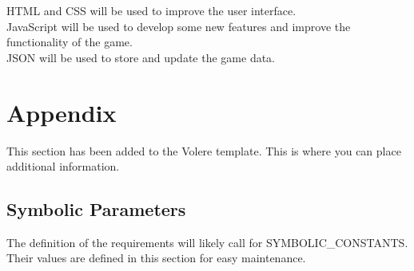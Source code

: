 \documentclass[12pt, titlepage]{article}
\begin{document}
HTML and CSS will be used to improve the user interface. \\
JavaScript will be used to develop some new features and improve the functionality of the game. \\
JSON will be used to store and update the game data. \\






\newpage

\section{Appendix}

This section has been added to the Volere template.  This is where you can place
additional information.

\subsection{Symbolic Parameters}

The definition of the requirements will likely call for SYMBOLIC\_CONSTANTS.
Their values are defined in this section for easy maintenance.
\end{document}
